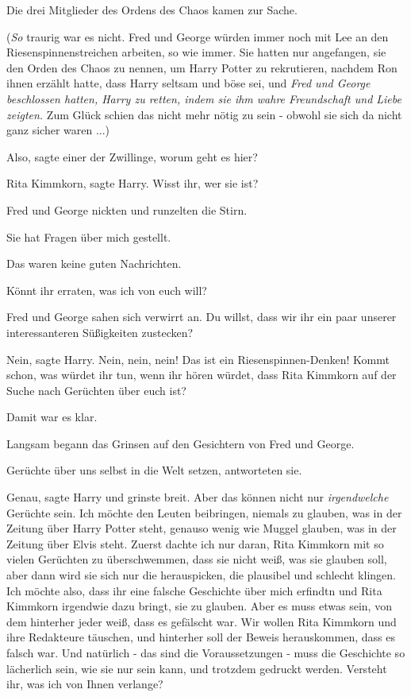 Die drei Mitglieder des Ordens des Chaos kamen zur Sache.

(\emph{So} traurig war es nicht. Fred und George würden immer noch mit Lee an
den Riesenspinnenstreichen arbeiten, so wie immer. Sie hatten nur angefangen,
sie den Orden des Chaos zu nennen, um Harry Potter zu rekrutieren, nachdem Ron
ihnen erzählt hatte, dass Harry seltsam und böse sei, und \emph{Fred und George
beschlossen hatten, Harry zu retten, indem sie ihm wahre Freundschaft und Liebe
zeigten.} Zum Glück schien das nicht mehr nötig zu sein - obwohl sie sich da
nicht ganz sicher waren ...)

\glqq{}Also\grqq{}, sagte einer der Zwillinge, \glqq{}worum geht es hier?\grqq{}

\glqq{}Rita Kimmkorn\grqq{}, sagte Harry. \glqq{}Wisst ihr, wer sie ist?\grqq{}

Fred und George nickten und runzelten die Stirn.

\glqq{}Sie hat Fragen über mich gestellt.\grqq{}

Das waren keine guten Nachrichten.

\glqq{}Könnt ihr erraten, was ich von euch will?\grqq{}

Fred und George sahen sich verwirrt an. \glqq{}Du willst, dass wir ihr ein paar
unserer interessanteren Süßigkeiten zustecken?\grqq{}

\glqq{}Nein\grqq{}, sagte Harry. \glqq{}Nein, nein, nein! Das ist ein
Riesenspinnen-Denken! Kommt schon, was würdet ihr tun, wenn ihr hören würdet,
dass Rita Kimmkorn auf der Suche nach Gerüchten über euch ist?\grqq{}

Damit war es klar.

Langsam begann das Grinsen auf den Gesichtern von Fred und George.

\glqq{}Gerüchte über uns selbst in die Welt setzen\grqq{}, antworteten sie.

\glqq{}Genau\grqq{}, sagte Harry und grinste breit. \glqq{}Aber das können nicht
nur \emph{irgendwelche} Gerüchte sein. Ich möchte den Leuten beibringen, niemals
zu glauben, was in der Zeitung über Harry Potter steht, genauso wenig wie Muggel
glauben, was in der Zeitung über Elvis steht. Zuerst dachte ich nur daran, Rita
Kimmkorn mit so vielen Gerüchten zu überschwemmen, dass sie nicht weiß, was sie
glauben soll, aber dann wird sie sich nur die herauspicken, die plausibel und
schlecht klingen. Ich möchte also, dass ihr eine falsche Geschichte über mich
erfindtn und Rita Kimmkorn irgendwie dazu bringt, sie zu glauben. Aber es muss
etwas sein, von dem hinterher jeder weiß, dass es gefälscht war. Wir wollen Rita
Kimmkorn und ihre Redakteure täuschen, und hinterher soll der Beweis
herauskommen, dass es falsch war. Und natürlich - das sind die Voraussetzungen -
muss die Geschichte so lächerlich sein, wie sie nur sein kann, und trotzdem
gedruckt werden. Versteht ihr, was ich von Ihnen verlange?\grqq{}

